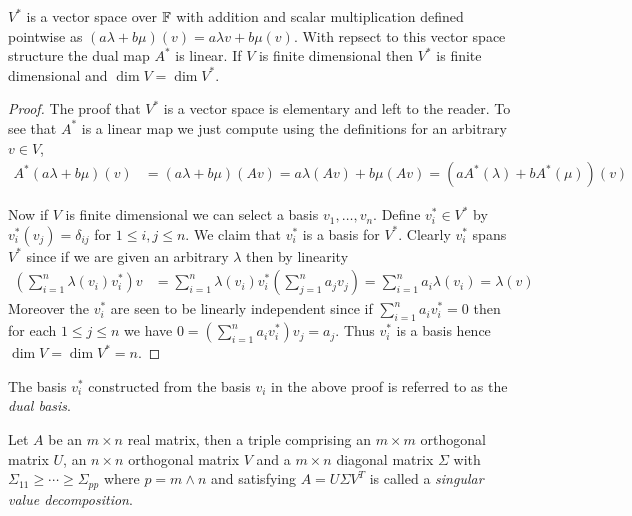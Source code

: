 \begin{prop}$V^*$ is a vector space over $\mathbb{F}$ with addition and scalar multiplication defined pointwise as $(a\lambda + b\mu)(v) = a\lambda v + b \mu(v)$.  With repsect to this vector space structure the dual map $A^*$ is linear.  If $V$ is finite dimensional then $V^*$ is finite dimensional and $\dim V = \dim V^*$.
\end{prop}
\begin{proof}
  The proof that $V^*$ is a vector space is elementary and left to the reader.  To see that $A^*$  is a linear map we just compute using the definitions for an
  arbitrary $v \in V$,
\begin{align*}
A^*( a \lambda + b \mu)(v) &= (a \lambda + b\mu)(Av) = a \lambda (Av) + b \mu (Av) = (a A^*(\lambda) + b A^*(\mu)) (v) 
\end{align*}

Now if $V$ is finite dimensional we can select a basis $v_1, \dotsc, v_n$.  Define $v_i^* \in V^*$ by $v_i^*(v_j) = \delta_{ij}$ for $1 \leq i,j \leq n$.  We claim that $v^*_i$ is a basis for $V^*$.  Clearly $v^*_i$ spans $V^*$ since if we are given an arbitrary $\lambda$ then by linearity
\begin{align*}
\left( \sum_{i=1}^n \lambda(v_i) v^*_i \right) v &= \sum_{i=1}^n \lambda(v_i) v^*_i (\sum_{j=1}^n a_j v_j) = \sum_{i=1}^n a_i \lambda(v_i) = \lambda(v)
\end{align*}
Moreover the $v^*_i$ are seen to be linearly independent since if $\sum_{i=1}^n a_i v^*_i = 0$ then for each $1 \leq j \leq n$ we have $0 = \left(\sum_{i=1}^n a_i v^*_i \right)v_j = a_j$.
Thus $v^*_i$ is a basis hence $\dim V  = \dim V^* = n$.
\end{proof}

The basis $v^*_i$ constructed from the basis $v_i$ in the above proof is referred to as the \emph{dual basis}.  

\begin{defn}Let $A$ be an $m \times n$ real matrix, then a triple comprising an $m \times m$ orthogonal matrix $U$, an $n \times n$ orthogonal matrix $V$ and a $m \times n$ diagonal matrix $\Sigma$ with $\Sigma_{11} \geq \dotsb \geq \Sigma_{pp}$ where $p = m \wedge n$ and satisfying $A = U \Sigma V^T$ is called a \emph{singular value decomposition}.
\end{defn}

